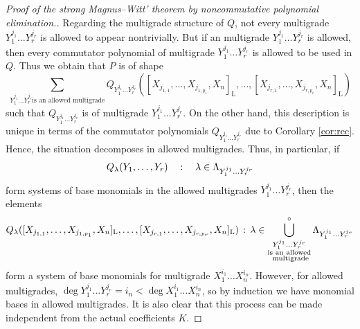 \documentclass[11pt,a4paper]{amsart}
\newcommand{\plabel}[1]{ \label{#1}}
\newcommand{\plabel}[1]{ \label{#1}\rlap{\smash{${}^{^{[#1]}}$}}}
\newcommand{\plabel}[1]{ \label{#1}}
\theoremstyle{definition}
\theoremstyle{plain}
\begin{document}
\begin{proof}[Proof of the strong Magnus--Witt' theorem  by noncommutative polynomial elimination.]
Regarding the multigrade structure of $Q$, not every multigrade $Y_1^{j_1}\ldots Y_{r}^{j_r}$ is allowed to appear nontrivially.
But if an multigrade $Y_1^{j_1}\ldots Y_{r}^{j_r}$ is allowed, then every commutator polynomial
 of multigrade $Y_1^{j_1}\ldots Y_{r}^{j_r}$ is allowed to be used in $Q$.
Thus we obtain that $P$ is of shape
\[\sum_{Y_1^{j_1}\ldots Y_{r}^{j_r} \text{is an allowed multigrade}}
Q_{Y_1^{j_1}\ldots Y_{r}^{j_r}}( [X_{j_{1,1}}, \ldots,X_{j_{1,p_1}} ,X_n]_{\mathrm L}, \ldots , [X_{j_{r,1}}, \ldots,X_{j_{r,p_r}} ,X_n]_{\mathrm L} )\]
 such that $Q_{Y_1^{j_1}\ldots Y_{r}^{j_r}}$ is of multigrade $Y_1^{j_1}\ldots Y_{r}^{j_r}$.
On the other hand, this description is unique in terms of the commutator polynomials
 $Q_{Y_1^{j_1}\ldots Y_{r}^{j_r}}$ due to Corollary \ref{cor:rec}.
Hence, the situation decomposes in allowed multigrades.
Thus, in particular, if
\begin{equation}
Q_\lambda(Y_1,\ldots, Y_r)\quad:\quad\lambda\in\Lambda_{Y_1^{j_1}\ldots Y_{r}^{j_r}}
\notag%
\end{equation}
form systems of base monomials in the allowed multigrades $Y_1^{j_1}\ldots Y_{r}^{j_r}$, then the elements
\begin{equation}
Q_\lambda( [X_{j_{1,1}}, \ldots,X_{j_{1,p_1}} ,X_n]_{\mathrm L}, \ldots , [X_{j_{r,1}}, \ldots,X_{j_{r,p_r}} ,X_n]_{\mathrm L} )\,:
\,\lambda\in\bigcup_{\substack{Y_1^{j_1}\ldots Y_{r}^{j_r} \\\text{is an allowed}\\\text{ multigrade}}}^\circ \Lambda_{Y_1^{j_1}\ldots Y_{r}^{j_r}}
\notag%
\end{equation}
 form a system of base monomials for multigrade  $X_1^{i_1}\ldots X_n^{i_n}$.
However, for allowed multigrades, $\deg Y_1^{j_1}\ldots Y_{r}^{j_r}=i_n<\deg X_1^{i_1}\ldots X_n^{i_n}$,
 so by induction we have monomial bases in allowed multigrades.
It is also clear that this process can be made independent from the actual coefficients $K$.
\end{proof}
\end{document}
